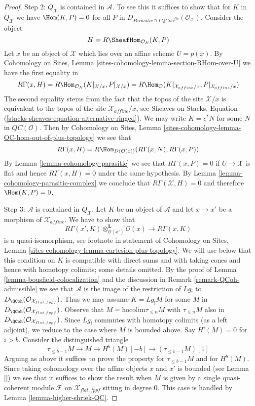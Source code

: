 \begin{proof}
\medskip\noindent
Step 2: $Q_\mathcal{X}$ is contained in $\mathcal{A}$.
To see this it suffices to show that for $K$ in $Q_\mathcal{X}$
we have $\Hom(K, P) = 0$ for all $P$ in
$D_{\textit{Parasitic} \cap \textit{LQCoh}^{fbc}}(\mathcal{O}_\mathcal{X})$.
Consider the object
$$
H = R\SheafHom_{\mathcal{O}_\mathcal{X}}(K, P)
$$
Let $x$ be an object of $\mathcal{X}$ which lies over an affine scheme
$U = p(x)$. By Cohomology on Sites, Lemma
\ref{sites-cohomology-lemma-section-RHom-over-U} we have
the first equality in
$$
R\Gamma(x, H) =
R\Hom_{\mathcal{O}_\mathcal{X}}(K|_{\mathcal{X}/x}, P|_{\mathcal{X}/x}) =
R\Hom_{\mathcal{O}}(K|_{\mathcal{X}_{affine}/x}, P|_{\mathcal{X}_{affine}/x})
$$
The second equality stems from the fact that the topos of the site
$\mathcal{X}/x$ is equivalent to the topos of the site
$\mathcal{X}_{affine}/x$, see Sheaves on Stacks, Equation
(\ref{stacks-sheaves-equation-alternative-ringed}).
We may write $K = \epsilon^*N$ for some $N$ in $\mathit{QC}(\mathcal{O})$.
Then by Cohomology on Sites, Lemma
\ref{sites-cohomology-lemma-QC-hom-out-of-plus-topology} we see
that
$$
R\Gamma(x, H) =
R\Hom_{D(\mathcal{O}(x))}(R\Gamma(x, N), R\Gamma(x, P))
$$
By Lemma \ref{lemma-cohomology-parasitic} we see that $R\Gamma(x, P) = 0$
if $U \to \mathcal{X}$ is flat and hence $R\Gamma(x, H) = 0$ under the same
hypothesis. By Lemma \ref{lemma-cohomology-parasitic-complex} we conclude that
$R\Gamma(\mathcal{X}, H) = 0$ and therefore $\Hom(K, P) = 0$.

\medskip\noindent
Step 3: $\mathcal{A}$ is contained in $Q_\mathcal{X}$.
Let $K$ be an object of $\mathcal{A}$ and let $x \to x'$
be a morphism of $\mathcal{X}_{affine}$. We have to show that
$$
R\Gamma(x', K) \otimes_{\mathcal{O}(x')}^\mathbf{L} \mathcal{O}(x)
\longrightarrow
R\Gamma(x, K)
$$
is a quasi-isomorphism, see footnote in statement of Cohomology on Sites,
Lemma \ref{sites-cohomology-lemma-cartesion-plus-topology}.
We will use below that this condition on $K$
is compatible with direct sums and with
taking cones and hence with homotopy colimits; some details omitted.
By the proof of Lemma \ref{lemma-bousfield-colocalization}
and the discussion in Remark \ref{remark-QCoh-admissible}
we see that $\mathcal{A}$ is the image of the restriction
of $Lg_!$ to $D_\QCoh(\mathcal{O}_{\mathcal{X}_{flat, fppf}})$.
Thus we may assume $K = Lg_!M$ for some $M$ in
$D_\QCoh(\mathcal{O}_{\mathcal{X}_{flat, fppf}})$.
Observe that $M = \text{hocolim} \tau_{\leq n}M$ with
$\tau_{\leq n}M$ also in $D_\QCoh(\mathcal{O}_{\mathcal{X}_{flat, fppf}})$.
Since $Lg_!$ commutes with homotopy colimits
(as a left adjoint), we reduce to the case where $M$ is bounded above.
Say $H^i(M) = 0$ for $i > b$.
Consider the distinguished triangle
$$
\tau_{\leq b - 1}M \to M \to H^b(M)[-b] \to (\tau_{\leq b - 1}M)[1]
$$
Arguing as above it suffices to prove the property for
$\tau_{\leq b - 1}M$ and for $H^b(M)$. Since taking cohomology
over the affine objects $x$ and $x'$ is bounded (see Lemma \ref{})
we see that it suffices to show the result when $M$ is given by
a single quasi-coherent module $\mathcal{F}$ on
$\mathcal{X}_{flat, fppf}$ sitting in degree $0$.
This case is handled by Lemma \ref{lemma-higher-shriek-QC}.
\end{proof}
